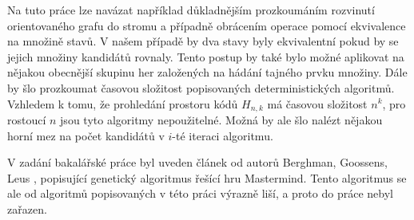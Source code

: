 
Na tuto práce lze navázat například důkladnějším prozkoumáním rozvinutí orientovaného grafu do stromu a případně obrácením operace pomocí ekvivalence na množině stavů. V našem případě by dva stavy byly ekvivalentní pokud by se jejich množiny kandidátů rovnaly. Tento postup by také bylo možné aplikovat na nějakou obecnější skupinu her založených na hádání tajného prvku množiny. Dále by šlo prozkoumat časovou složitost popisovaných deterministických algoritmů. Vzhledem k tomu, že prohledání prostoru kódů $H_{n,k}$ má časovou složitost $n^k$, pro rostoucí $n$ jsou tyto algoritmy nepoužitelné. Možná by ale šlo nalézt nějakou horní mez na počet kandidátů v $i$-té iteraci algoritmu. 


V zadání bakalářské práce byl uveden článek od autorů Berghman, Goossens, Leus \cite{BERGHMAN20091880}, popisující genetický algoritmus řešící hru Mastermind. Tento algoritmus se ale od algoritmů popisovaných v této práci výrazně liší, a proto do práce nebyl zařazen. 

